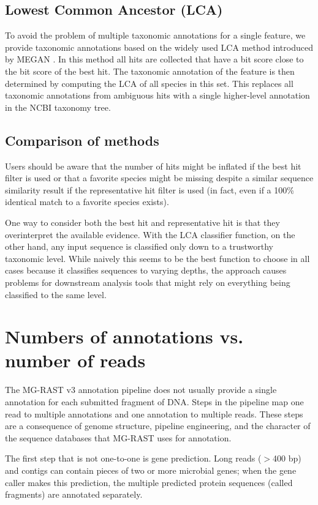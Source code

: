 \documentclass[12pt,fullpage]{report}
\begin{document}
\subsection{Lowest Common Ancestor (LCA)}
\label{section:LCA}
To avoid the problem of multiple taxonomic annotations for a single feature, we provide taxonomic annotations based on the widely used LCA method introduced by MEGAN \cite{MEGAN}. In this method all hits are collected that have a bit score close to the bit score of the best hit. The taxonomic annotation of the feature is then determined by computing the LCA of all species in this set. This replaces all taxonomic annotations from ambiguous hits with a single higher-level annotation in the NCBI taxonomy tree.

\subsection{Comparison of methods}
Users should be aware that the number of hits might be inflated if the best hit filter is used or that a favorite species might be missing despite a similar sequence similarity result if the representative hit filter is used (in fact, even if a 100\% identical match to a favorite species exists).

One way to consider both the best hit and representative hit is that they overinterpret the available evidence. With the LCA classifier function, on the other hand, any input sequence is classified only down to a trustworthy taxonomic level. While naively this seems to be the best function to choose in all cases because it classifies sequences to varying depths, the approach causes problems for downstream analysis tools that might rely on everything being classified to the same level.

\section{Numbers of annotations vs. number of reads}

The MG-RAST v3 annotation pipeline does not usually provide a single annotation for each submitted fragment of DNA. Steps in the pipeline map one read to multiple annotations and one annotation to multiple reads. These steps are a consequence of genome structure, pipeline engineering, and the character of the sequence databases that MG-RAST uses for annotation.

The first step that is not one-to-one is gene prediction. Long reads ($>$400 bp) and contigs can contain pieces of two or more microbial genes; when the gene caller makes this prediction, the multiple predicted protein sequences (called fragments) are annotated separately.
\end{document}
